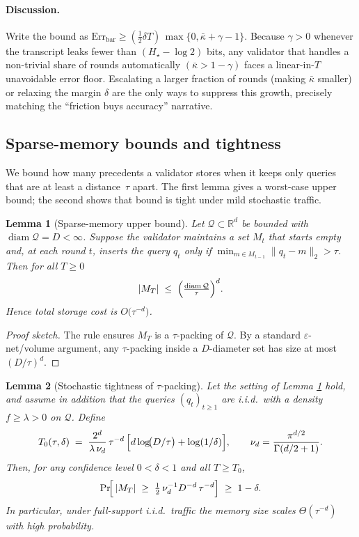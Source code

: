 \documentclass[11pt]{article}
\newcommand{\Err}{\mathrm{Err}}
\newtheorem{lemma}{Lemma}
\begin{document}
\paragraph{Discussion.}
Write the bound as  
\(\Err_{\mathrm{bar}}\!\ge(\tfrac12\delta T)\,\max\{0,\bar\kappa+\gamma-1\}\).
Because \(\gamma>0\) whenever the transcript leaks
fewer than \((H_{\star}-\log 2)\) bits, any validator that
handles a non-trivial share of rounds automatically
\((\bar\kappa>1-\gamma)\)
faces a linear-in-$T$ unavoidable error floor.
Escalating a larger fraction of rounds (making $\bar\kappa$ smaller) or
relaxing the margin $\delta$ are the only ways to suppress this growth,
precisely matching the “friction buys accuracy” narrative.



\subsection{Sparse-memory bounds and tightness}
\label{sec:sparse-memory-bound-tightness}

We bound how many precedents a validator stores when it keeps only queries that
are at least a distance~$\tau$ apart.  The first lemma gives a worst-case upper
bound; the second shows that bound is tight under mild stochastic traffic.

\begin{lemma}[Sparse-memory upper bound]\label{lem:2}
Let $\mathcal Q\subset\mathbb R^{d}$ be bounded with
$\operatorname{diam}\mathcal Q=D<\infty$.
Suppose the validator maintains a set $M_t$ that starts empty and, at each
round $t$, inserts the query $q_t$ \emph{only if}
\(\min_{m\in M_{t-1}}\lVert q_t-m\rVert_2>\tau\).
Then for all $T\ge0$
\[
  |M_T|
  \;\le\;
  \Bigl(\tfrac{\operatorname{diam}\mathcal Q}{\tau}\Bigr)^{d}.
\]
Hence total storage cost is \(O\!\bigl(\tau^{-d}\bigr)\).
\end{lemma}

\begin{proof}[Proof sketch]
The rule ensures $M_T$ is a $\tau$-packing of $\mathcal Q$.
By a standard $\varepsilon$-net/volume argument, any $\tau$-packing inside a
$D$-diameter set has size at most $(D/\tau)^{d}$.
\end{proof}

\begin{lemma}[Stochastic tightness of $\tau$-packing]\label{lem:3}
Let the setting of Lemma \ref{lem:2} hold, and assume in addition that the
queries $(q_t)_{t\ge1}$ are i.i.d.\ with a density
$f\ge\lambda>0$ on $\mathcal Q$.
Define
\[
  T_0(\tau,\delta)\;=\;
  \frac{2^{d}}{\lambda\,\nu_d}\,
  \tau^{-d}\,
  \Bigl[d\log\!\bigl(D/\tau\bigr)+\log(1/\delta)\Bigr],
  \qquad
  \nu_d=\frac{\pi^{d/2}}{\Gamma(d/2+1)}.
\]
Then, for any confidence level $0<\delta<1$ and all $T\ge T_0$,
\[
  \Pr\!\Bigl[\,|M_T|\;\ge\;
        \tfrac12\,\nu_d^{-1}D^{-d}\,\tau^{-d}\Bigr]
  \;\ge\;1-\delta.
\]
In particular, under full-support i.i.d.\ traffic the memory size scales
\(\Theta(\tau^{-d})\) with high probability.
\end{lemma}
\end{document}
